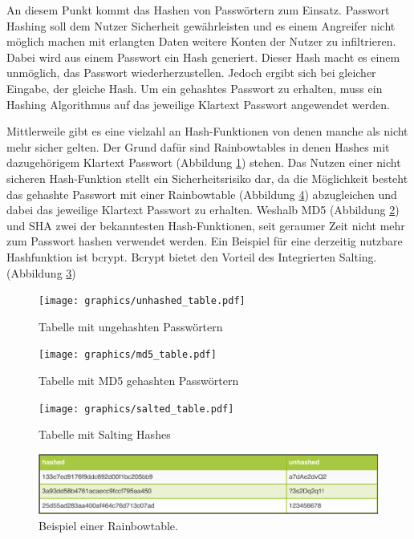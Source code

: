 An diesem Punkt kommt das Hashen von Passwörtern zum Einsatz. Passwort Hashing soll dem Nutzer Sicherheit gewährleisten und es einem Angreifer nicht möglich machen mit erlangten Daten weitere Konten der Nutzer zu infiltrieren. Dabei wird aus einem Passwort ein Hash generiert. Dieser Hash macht es einem unmöglich, das Passwort wiederherzustellen. Jedoch ergibt sich bei gleicher Eingabe, der gleiche Hash. Um ein gehashtes Passwort zu erhalten, muss ein Hashing Algorithmus auf das jeweilige Klartext Passwort angewendet werden.

Mittlerweile gibt es eine vielzahl an Hash-Funktionen von denen manche als nicht mehr sicher gelten. Der Grund dafür sind Rainbowtables in denen Hashes mit dazugehörigem Klartext Passwort (Abbildung \ref{fig:unhashed_table}) stehen. Das Nutzen einer nicht sicheren Hash-Funktion stellt ein Sicherheitsrisiko dar, da die Möglichkeit besteht das gehashte Passwort mit einer Rainbowtable (Abbildung \ref{fig:rainbowtable}) abzugleichen und dabei das jeweilige Klartext Passwort zu erhalten. Weshalb MD5 (Abbildung \ref{fig:md5_hashed_table}) und SHA zwei der bekanntesten Hash-Funktionen, seit geraumer Zeit nicht mehr zum Passwort hashen verwendet werden. Ein Beispiel für eine derzeitig nutzbare Hashfunktion ist bcrypt. Bcrypt bietet den Vorteil des Integrierten Salting. (Abbildung \ref{fig:salted_table})

\begin{figure}
	\texttt{[image: graphics/unhashed\_table.pdf]}
	\caption{Tabelle mit ungehashten Passwörtern}
	\label{fig:unhashed_table}
\end{figure}

\begin{figure}
	\texttt{[image: graphics/md5\_table.pdf]}
	\caption{Tabelle mit MD5 gehashten Passwörtern}
	\label{fig:md5_hashed_table}
\end{figure}

\begin{figure}
	\texttt{[image: graphics/salted\_table.pdf]}
	\caption{Tabelle mit Salting Hashes}
	\label{fig:salted_table}
\end{figure}

\begin{figure}
	\includegraphics[width=\textwidth]{graphics/rainbowtable.pdf}
	\caption{Beispiel einer Rainbowtable.}
	\label{fig:rainbowtable}
\end{figure}


